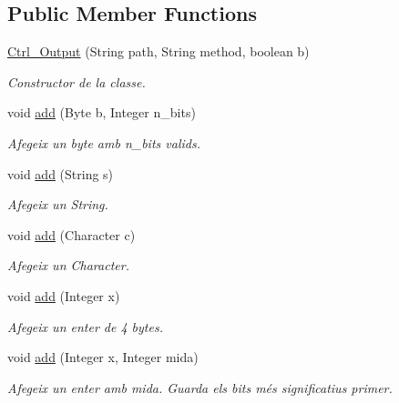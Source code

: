 \subsection*{Public Member Functions}
\begin{DoxyCompactItemize}
\item 
\hyperlink{classpersistencia_1_1output_1_1Ctrl__Output_afeb28ec6172b522bf6bdaf16238d622b}{Ctrl\+\_\+\+Output} (String path, String method, boolean b)
\begin{DoxyCompactList}\small\item\em Constructor de la classe. \end{DoxyCompactList}\item 
void \hyperlink{classpersistencia_1_1output_1_1Ctrl__Output_a8c5aa5a6acb5259faeb1c05c71ddd21c}{add} (Byte b, Integer n\+\_\+bits)
\begin{DoxyCompactList}\small\item\em Afegeix un byte amb n\+\_\+bits valids. \end{DoxyCompactList}\item 
void \hyperlink{classpersistencia_1_1output_1_1Ctrl__Output_a0e3bedb0b88d0e60b228cc49143e6f0e}{add} (String s)
\begin{DoxyCompactList}\small\item\em Afegeix un String. \end{DoxyCompactList}\item 
void \hyperlink{classpersistencia_1_1output_1_1Ctrl__Output_a4070b40016edf1d959b3f7c60c90ef10}{add} (Character c)
\begin{DoxyCompactList}\small\item\em Afegeix un Character. \end{DoxyCompactList}\item 
void \hyperlink{classpersistencia_1_1output_1_1Ctrl__Output_aefe249b0ae9dbe578c44d96c6b56cf5d}{add} (Integer x)
\begin{DoxyCompactList}\small\item\em Afegeix un enter de 4 bytes. \end{DoxyCompactList}\item 
void \hyperlink{classpersistencia_1_1output_1_1Ctrl__Output_ac792cc55e30c9c769e10a20c2dd41bc8}{add} (Integer x, Integer mida)
\begin{DoxyCompactList}\small\item\em Afegeix un enter amb mida. Guarda els bits més significatius primer. \end{DoxyCompactList}\item 

\end{DoxyCompactItemize}
